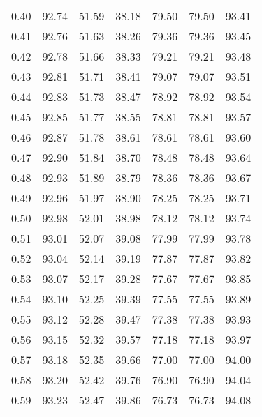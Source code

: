 \begin{tabular}{|c|c|c|c|c|c|c|}
      0.40 &     92.74 &     51.59 &      38.18 &   79.50 &      79.50 &         93.41 \\
      0.41 &     92.76 &     51.63 &      38.26 &   79.36 &      79.36 &         93.45 \\
      0.42 &     92.78 &     51.66 &      38.33 &   79.21 &      79.21 &         93.48 \\
      0.43 &     92.81 &     51.71 &      38.41 &   79.07 &      79.07 &         93.51 \\
      0.44 &     92.83 &     51.73 &      38.47 &   78.92 &      78.92 &         93.54 \\
      0.45 &     92.85 &     51.77 &      38.55 &   78.81 &      78.81 &         93.57 \\
      0.46 &     92.87 &     51.78 &      38.61 &   78.61 &      78.61 &         93.60 \\
      0.47 &     92.90 &     51.84 &      38.70 &   78.48 &      78.48 &         93.64 \\
      0.48 &     92.93 &     51.89 &      38.79 &   78.36 &      78.36 &         93.67 \\
      0.49 &     92.96 &     51.97 &      38.90 &   78.25 &      78.25 &         93.71 \\
      0.50 &     92.98 &     52.01 &      38.98 &   78.12 &      78.12 &         93.74 \\
      0.51 &     93.01 &     52.07 &      39.08 &   77.99 &      77.99 &         93.78 \\
      0.52 &     93.04 &     52.14 &      39.19 &   77.87 &      77.87 &         93.82 \\
      0.53 &     93.07 &     52.17 &      39.28 &   77.67 &      77.67 &         93.85 \\
      0.54 &     93.10 &     52.25 &      39.39 &   77.55 &      77.55 &         93.89 \\
      0.55 &     93.12 &     52.28 &      39.47 &   77.38 &      77.38 &         93.93 \\
      0.56 &     93.15 &     52.32 &      39.57 &   77.18 &      77.18 &         93.97 \\
      0.57 &     93.18 &     52.35 &      39.66 &   77.00 &      77.00 &         94.00 \\
      0.58 &     93.20 &     52.42 &      39.76 &   76.90 &      76.90 &         94.04 \\
      0.59 &     93.23 &     52.47 &      39.86 &   76.73 &      76.73 &         94.08 \\

\end{tabular}
